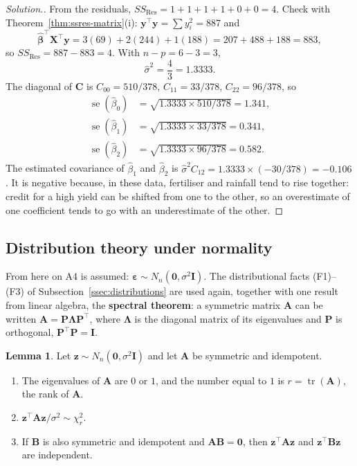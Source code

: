 \documentclass[11pt,a4paper]{article}
\numberwithin{equation}{section}
\theoremstyle{definition}
\newtheorem{lem}[thm]{Lemma}
\newenvironment{solution}
  {\renewcommand{\qedsymbol}{}\begin{proof}[\textit{Solution}.]}
  {\end{proof}}
\begin{document}
\begin{solution}
From the residuals, $SS_{\mathrm{Res}} = 1 + 1 + 1 + 1 + 0 + 0 = 4$. Check with
Theorem~\ref{thm:ssres-matrix}(i): $\mathbf{y}^\top\mathbf{y} = \sum y_i^2 = 887$ and
\[
\hat{\boldsymbol\beta}^\top\mathbf{X}^\top\mathbf{y} = 3(69) + 2(244) + 1(188) = 207 + 488 + 188 = 883,
\]
so $SS_{\mathrm{Res}} = 887 - 883 = 4$. With $n - p = 6 - 3 = 3$,
\[
\hat\sigma^2 = \frac43 = 1.3333 .
\]
The diagonal of $\mathbf{C}$ is $C_{00} = 510/378$, $C_{11} = 33/378$, $C_{22} = 96/378$, so
\begin{align*}
\operatorname{se}(\hat\beta_0) &= \sqrt{1.3333 \times 510/378} = 1.341, \\
\operatorname{se}(\hat\beta_1) &= \sqrt{1.3333 \times 33/378} = 0.341, \\
\operatorname{se}(\hat\beta_2) &= \sqrt{1.3333 \times 96/378} = 0.582 .
\end{align*}
The estimated covariance of $\hat\beta_1$ and $\hat\beta_2$ is
$\hat\sigma^2 C_{12} = 1.3333 \times (-30/378) = -0.106$. It is negative because, in these
data, fertiliser and rainfall tend to rise together: credit for a high yield can be shifted
from one to the other, so an overestimate of one coefficient tends to go with an
underestimate of the other.
\end{solution}

\subsection{Distribution theory under normality}
From here on A4 is assumed: $\boldsymbol\varepsilon \sim N_n(\mathbf{0}, \sigma^2\mathbf{I})$.
The distributional facts (F1)--(F3) of Subsection~\ref{ssec:distributions} are used again,
together with one result from linear algebra, the \textbf{spectral theorem}: a symmetric
matrix $\mathbf{A}$ can be written $\mathbf{A} = \mathbf{P}\boldsymbol\Lambda\mathbf{P}^\top$,
where $\boldsymbol\Lambda$ is the diagonal matrix of its eigenvalues and $\mathbf{P}$ is
orthogonal, $\mathbf{P}^\top\mathbf{P} = \mathbf{I}$.

\begin{lem}\label{lem:idempotent-chisq}
Let $\mathbf{z} \sim N_n(\mathbf{0}, \sigma^2\mathbf{I})$ and let $\mathbf{A}$ be symmetric
and idempotent.
\begin{enumerate}[label=(\roman*)]
\item The eigenvalues of $\mathbf{A}$ are $0$ or $1$, and the number equal to $1$ is
$r = \operatorname{tr}(\mathbf{A})$, the rank of $\mathbf{A}$.
\item $\mathbf{z}^\top\mathbf{A}\mathbf{z}/\sigma^2 \sim \chi^2_r$.
\item If $\mathbf{B}$ is also symmetric and idempotent and $\mathbf{AB} = \mathbf{0}$, then
$\mathbf{z}^\top\mathbf{A}\mathbf{z}$ and $\mathbf{z}^\top\mathbf{B}\mathbf{z}$ are independent.
\end{enumerate}
\end{lem}
\end{document}
